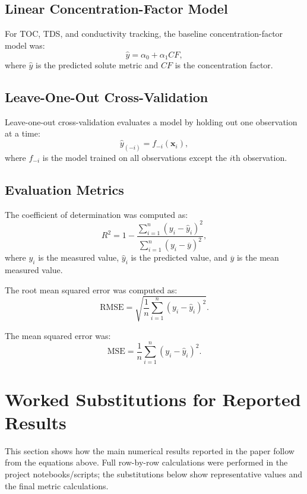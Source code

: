 \subsection{Linear Concentration-Factor Model}
For TOC, TDS, and conductivity tracking, the baseline concentration-factor model was:
\begin{equation}
\hat{y} = \alpha_0+\alpha_1 CF,
\end{equation}
where $\hat{y}$ is the predicted solute metric and $CF$ is the concentration factor.

\subsection{Leave-One-Out Cross-Validation}
Leave-one-out cross-validation evaluates a model by holding out one observation at a time:
\begin{equation}
\hat{y}_{(-i)} = f_{-i}(\mathbf{x}_i),
\end{equation}
where $f_{-i}$ is the model trained on all observations except the $i$th observation.

\subsection{Evaluation Metrics}
The coefficient of determination was computed as:
\begin{equation}
R^2 =
1-\frac{\sum_{i=1}^{n}(y_i-\hat{y}_i)^2}
{\sum_{i=1}^{n}(y_i-\overline{y})^2},
\end{equation}
where $y_i$ is the measured value, $\hat{y}_i$ is the predicted value, and $\overline{y}$ is the mean measured value.

The root mean squared error was computed as:
\begin{equation}
\mathrm{RMSE} =
\sqrt{\frac{1}{n}\sum_{i=1}^{n}(y_i-\hat{y}_i)^2}.
\end{equation}

The mean squared error was:
\begin{equation}
\mathrm{MSE} =
\frac{1}{n}\sum_{i=1}^{n}(y_i-\hat{y}_i)^2.
\end{equation}

\section{Worked Substitutions for Reported Results}

This section shows how the main numerical results reported in the paper follow from the equations above. Full row-by-row calculations were performed in the project notebooks/scripts; the substitutions below show representative values and the final metric calculations.


